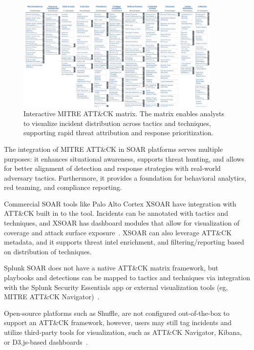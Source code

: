 \begin{figure}[ht]
    \centering
    \includegraphics[width=0.9\textwidth]{images/mitre_att&ck_matrix.png}
    \caption[Interactive MITRE ATT\&CK matrix]{Interactive MITRE ATT\&CK matrix. The matrix enables analysts to visualize incident distribution across tactics and techniques, supporting rapid threat attribution and response prioritization.}
    \label{fig:mitre-attck-matrix}
\end{figure}

The integration of MITRE ATT\&CK in SOAR platforms serves multiple purposes: it enhances situational awareness, supports threat hunting, and allows for better alignment of detection and response strategies with real-world adversary tactics. Furthermore, it provides a foundation for behavioral analytics, red teaming, and compliance reporting.

Commercial SOAR tools like Palo Alto Cortex XSOAR have integration with ATT\&CK built in to the tool. Incidents can be annotated with tactics and techniques, and XSOAR has dashboard modules that allow for visualization of coverage and attack surface exposure~\cite{paloalto}. XSOAR can also leverage ATT\&CK metadata, and it supports threat intel enrichment, and filtering/reporting based on distribution of techniques. 

Splunk SOAR does not have a native ATT\&CK matrix framework, but playbooks and detections can be mapped to tactics and techniques via integration with the Splunk Security Essentials app or external visualization tools (eg, MITRE ATT\&CK Navigator)~\cite{splunk}.

Open-source platforms such as Shuffle, are not configured out-of-the-box to support an ATT\&CK framework, however, users may still tag incidents and utilize third-party tools for visualization, such as ATT\&CK Navigator, Kibana, or D3.js-based dashboards~\cite{techtarget}.

